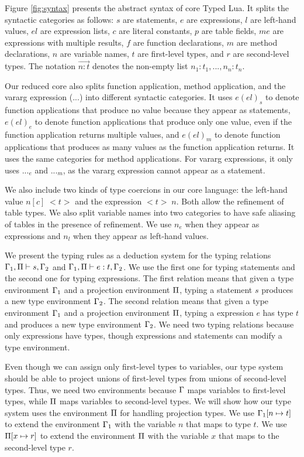 Figure \ref{fig:syntax} presents the abstract syntax of core Typed Lua.
It splits the syntactic categories as follows:
$s$ are statements, $e$ are expressions, $l$ are left-hand values,
$el$ are expression lists, $c$ are literal constants, $p$ are table fields,
$me$ are expressions with multiple results, $f$ are function declarations,
$m$ are method declarations, $n$ are variable names,
$t$ are first-level types, and $r$ are second-level types.
The notation $\vec{n{:}t}$ denotes the non-empty list
$n_{1}{:}t_{1}, ..., n_{n}{:}t_{n}$.

Our reduced core also splits function application, method application, and
the vararg expression (${...}$) into different syntactic categories.
It uses $e(el)_{s}$ to denote function applications that produce no value
because they appear as statements,
$e(el)_{e}$ to denote function applications that produce only one value,
even if the function application returns multiple values,
and $e(el)_{m}$ to denote function applications that produces as many values
as the function application returns.
It uses the same categories for method applications.
For vararg expressions, it only uses ${...}_{e}$ and ${...}_{m}$,
as the vararg expression cannot appear as a statement.

We also include two kinds of type coercions in our core language:
the left-hand value $n[c] \; {<}t{>}$ and the expression ${<}t{>} \;n$.
Both allow the refinement of table types.
We also split variable names into two categories to have safe aliasing
of tables in the presence of refinement.
We use $n_{e}$ when they appear as expressions and $n_{l}$ when they
appear as left-hand values.

We present the typing rules as a deduction system for the typing relations
$\Gamma_{1}, \Pi \vdash s, \Gamma_{2}$ and $\Gamma_{1}, \Pi \vdash e : t, \Gamma_{2}$.
We use the first one for typing statements and the second one for typing expressions.
The first relation means that given a type environment $\Gamma_{1}$
and a projection environment $\Pi$, typing a statement $s$ produces
a new type environment $\Gamma_{2}$.
The second relation means that given a type environment $\Gamma_{1}$
and a projection environment $\Pi$, typing a expression $e$ has
type $t$ and produces a new type environment $\Gamma_{2}$.
We need two typing relations because only expressions have types,
though expressions and statements can modify a type environment.

Even though we can assign only first-level types to variables,
our type system should be able to project unions of first-level types
from unions of second-level types.
Thus, we need two environments because $\Gamma$ maps variables to first-level types,
while $\Pi$ maps variables to second-level types.
We will show how our type system uses the environment $\Pi$ for
handling projection types.
We use $\Gamma_{1}[n \mapsto t]$ to extend the environment $\Gamma_{1}$
with the variable $n$ that maps to type $t$.
We use $\Pi[x \mapsto r]$ to extend the environment $\Pi$ with
the variable $x$ that maps to the second-level type $r$.

